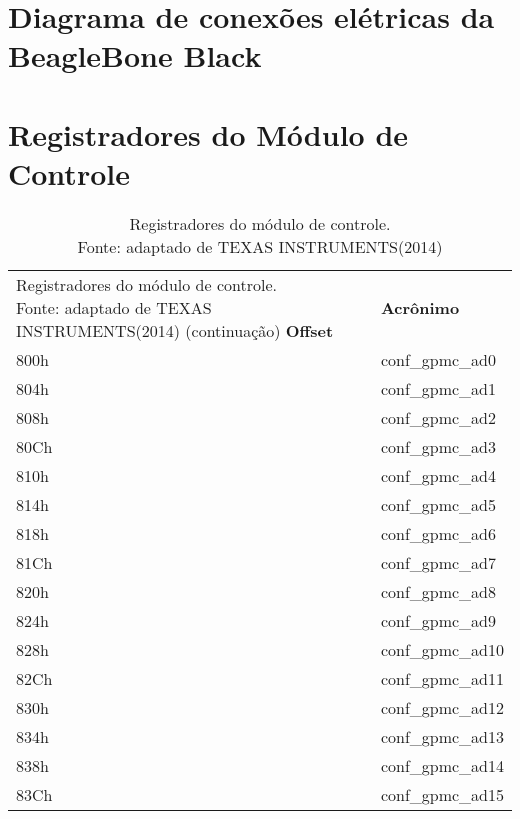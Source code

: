 \chapter{Diagrama de conex\~oes el\'etricas da BeagleBone Black}
\label{Anexo1}



\chapter{Registradores do M\'odulo de Controle}
\label{Anexo2}


\begin{longtable}{ | M{7.5cm} | M{7.5cm} |}
	\captionsetup{justification=centering}
	\caption[Registradores do m\'odulo de controle]{Registradores do m\'odulo  de controle. \\Fonte: adaptado de TEXAS INSTRUMENTS(2014)}
	\label{dt_offset}\\
	\endfirsthead
		\caption[]{Registradores do m\'odulo  de controle. \\Fonte: adaptado de TEXAS INSTRUMENTS(2014) (continua\c{c}\~ao)}
	\endhead
	\hline
	\textbf{Offset} & \textbf{Acr\^onimo} \\ \hline
	800h & conf\_gpmc\_ad0 \\ \hline
	804h & conf\_gpmc\_ad1 \\ \hline
	808h & conf\_gpmc\_ad2 \\ \hline
	80Ch & conf\_gpmc\_ad3 \\ \hline
	810h & conf\_gpmc\_ad4 \\ \hline
	814h & conf\_gpmc\_ad5 \\ \hline
	818h & conf\_gpmc\_ad6 \\ \hline
	81Ch & conf\_gpmc\_ad7 \\ \hline
	820h & conf\_gpmc\_ad8 \\ \hline
	824h & conf\_gpmc\_ad9 \\ \hline
	828h & conf\_gpmc\_ad10 \\ \hline
	82Ch & conf\_gpmc\_ad11 \\ \hline
	830h & conf\_gpmc\_ad12 \\ \hline
	834h & conf\_gpmc\_ad13 \\ \hline
	838h & conf\_gpmc\_ad14 \\ \hline
	83Ch & conf\_gpmc\_ad15 \\ \hline

\end{longtable}
